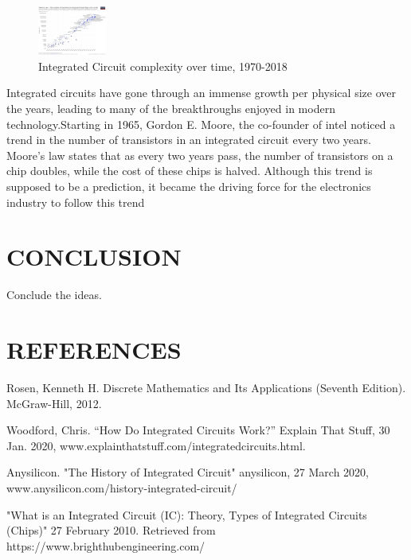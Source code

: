 \documentclass[letterpaper, 10 pt, conference]{IEEEconf}
\begin{document}
\begin{figure}[h!]
\centering
\captionsetup{justification=centering}
\includegraphics[width=0.2\textwidth]{1024px-Moore's_Law_Transistor_Count_1971-2018.png}
\caption{Integrated Circuit complexity over time, 1970-2018}
\label{fig:example}
\end{figure} 

Integrated circuits have gone through an immense growth per physical size over the years, leading to many of the breakthroughs enjoyed in modern technology.Starting in 1965, Gordon E. Moore, the co-founder of intel noticed a trend in the number of transistors in an integrated circuit every two years. Moore’s law states that as every two years pass, the number of transistors on a chip doubles, while the cost of these chips is halved. Although this trend is supposed to be a prediction, it became the driving force for the electronics industry to follow this trend

\section{CONCLUSION}

Conclude the ideas.

\section*{REFERENCES}


\begin{enumerate}[label={[\arabic*]}]
\item Rosen, Kenneth  H. Discrete Mathematics and Its Applications (Seventh Edition). McGraw-Hill, 2012. 
\item Woodford, Chris. “How Do Integrated Circuits Work?” Explain That Stuff, 30 Jan. 2020, www.explainthatstuff.com/integratedcircuits.html. 
\item Anysilicon. "The History of Integrated Circuit" anysilicon, 27 March 2020,
www.anysilicon.com/history-integrated-circuit/
\item "What is an Integrated Circuit (IC): Theory, Types of Integrated Circuits (Chips)" 27 February 2010. Retrieved from https://www.brighthubengineering.com/



\end{enumerate}
\end{document}
